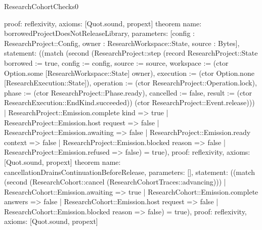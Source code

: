 \begin{lexlean}{ResearchCohortChecks0}
\begin{semanticmodule}
{ proof: reflexivity{},
 axioms: [Quot.sound, propext]
}
theorem{
 name: borrowedProjectDoesNotReleaseLibrary,
 parameters: [config : ResearchProject::Config, owner : ResearchWorkspace::State, source : Bytes],
 statement: ((match (second (ResearchProject::step (record ResearchProject::State {borrowed := true, config := config, source := source, workspace := (ctor Option.some [ResearchWorkspace::State] owner), execution := (ctor Option.none [ResearchExecution::State]), operation := (ctor ResearchProject::Operation.lock), phase := (ctor ResearchProject::Phase.ready), cancelled := false, result := (ctor ResearchExecution::EndKind.succeeded)}) (ctor ResearchProject::Event.release))) | ResearchProject::Emission.complete kind => true | ResearchProject::Emission.host request => false | ResearchProject::Emission.awaiting => false | ResearchProject::Emission.ready context => false | ResearchProject::Emission.blocked reason => false | ResearchProject::Emission.refused => false) = true),
 proof: reflexivity{},
 axioms: [Quot.sound, propext]
}
theorem{
 name: cancellationDrainsContinuationBeforeRelease,
 parameters: [],
 statement: ((match (second (ResearchCohort::cancel (ResearchCohortTraces::advancing))) | ResearchCohort::Emission.awaiting => true | ResearchCohort::Emission.complete answers => false | ResearchCohort::Emission.host request => false | ResearchCohort::Emission.blocked reason => false) = true),
 proof: reflexivity{},
 axioms: [Quot.sound, propext]
}
\end{semanticmodule}
\end{lexlean}
